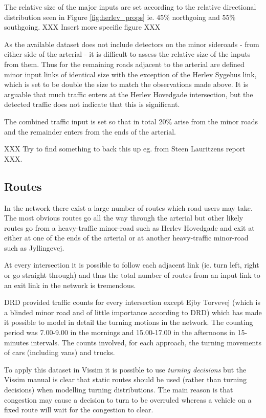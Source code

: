 The relative size of the major inputs are set according to the relative directional distribution seen in Figure \ref{fig:herlev_props} ie. 45\% northgoing and 55\% southgoing. XXX Insert more specific figure XXX

As the available dataset does not include detectors on the minor sideroads - from either side of the arterial - it is difficult to assess the relative size of the inputs from them. Thus for the remaining roads adjacent to the arterial are defined minor input links of identical size with the exception of the Herlev Sygehus link, which is set to be double the size to match the observations made above.
It is arguable that much traffic enters at the Herlev Hovedgade intersection, but the detected traffic does not indicate that this is significant.

The combined traffic input is set so that in total 20\% arise from the minor roads and the remainder enters from the ends of the arterial. 

XXX Try to find something to back this up eg. from Steen Lauritzens report XXX.

\subsection{Routes}
\label{routefractions}
In the network there exist a large number of routes which road users may take. The most obvious routes go all the way through the arterial but other likely routes go from a heavy-traffic minor-road such as Herlev Hovedgade and exit at either at one of the ends of the arterial or at another heavy-traffic minor-road such as Jyllingevej.

At every intersection it is possible to follow each adjacent link (ie. turn left, right or go straight through) and thus the total number of routes from an input link to an exit link in the network is tremendous.

DRD provided traffic counts for every intersection except Ejby Torvevej (which is a blinded minor road and of little importance according to DRD) which has made it possible to model in detail the turning motions in the network.
The counting period was 7.00-9.00 in the mornings and 15.00-17.00 in the afternoons in 15-minutes intervals. The counts involved, for each approach, the turning movements of cars (including vans) and trucks. 

To apply this dataset in Vissim it is possible to use \textit{turning decisions} but the Vissim manual is clear that static routes should be used (rather than turning decisions) when modelling turning distributions. The main reason is that congestion may cause a decision to turn to be overruled whereas a vehicle on a fixed route will wait for the congestion to clear. 


